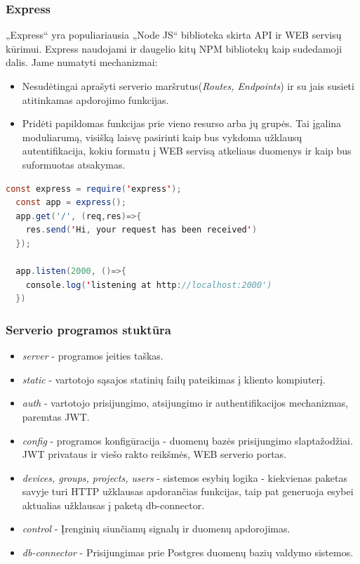 \documentclass{VUMIFInfBakalaurinis}
\begin{document}
\subsubsection{Express}

„Express“ yra populiariausia „Node JS“ biblioteka skirta API ir WEB servisų kūrimui. Express naudojami ir daugelio kitų 
NPM bibliotekų kaip sudedamoji dalis.
Jame numatyti mechanizmai:

\begin{itemize}
\item Nesudėtingai aprašyti serverio maršrutus(\emph{Routes, Endpoints}) ir su jais susieti atitinkamas apdorojimo funkcijas.
\item Pridėti papildomas funkcijas prie vieno resurso arba jų grupės. Tai įgalina moduliarumą, visišką laisvę pasirinti kaip bus vykdoma
užklausų autentifikacija, kokiu formatu į WEB servisą atkeliaus duomenys ir kaip bus suformuotas atsakymas.
\end{itemize}

\begin{lstlisting}[language=Java]
  const express = require('express');
  const app = express();
  app.get('/', (req,res)=>{
    res.send('Hi, your request has been received')
  });

  app.listen(2000, ()=>{
    console.log('listening at http://localhost:2000')
  })
\end{lstlisting}

\subsubsection{Serverio programos stuktūra}

\begin{itemize}
\item \emph{server} - programos įeities taškas.
\item \emph{static} - vartotojo sąsajos statinių failų pateikimas į kliento kompiuterį.
\item \emph{auth} - vartotojo prisijungimo, atsijungimo ir authentifikacijos mechanizmas, paremtas JWT.
\item \emph{config} - programos konfigūracija - duomenų bazės prisijungimo slaptažodžiai. JWT privataus ir viešo rakto reikšmės, WEB serverio portas.
\item \emph{devices, groups, projects, users} - sistemos esybių logika - kiekvienas paketas savyje turi HTTP užklausas apdorančias funkcijas, taip pat generuoja esybei aktualias užklausas į paketą db-connector.
\item \emph{control} - Įrenginių siunčiamų signalų ir duomenų apdorojimas. 
\item \emph{db-connector} - Prisijungimas prie Postgres duomenų bazių valdymo sistemos. \cite{NODEJSDB} 
\end{itemize}
\end{document}
